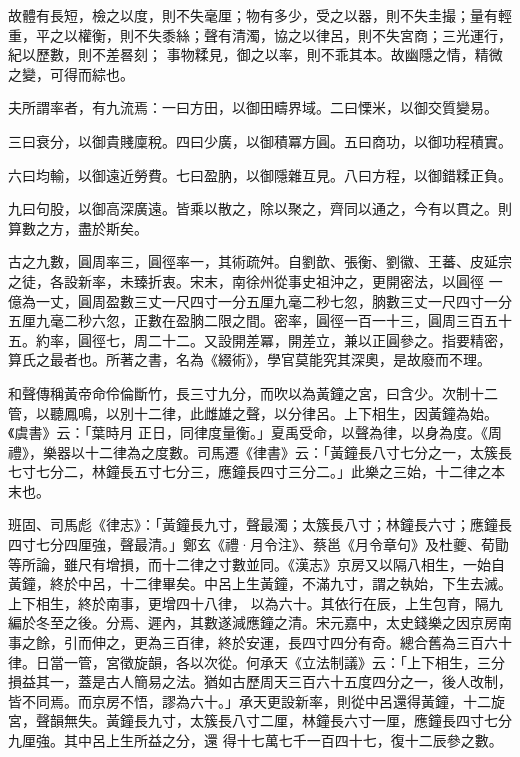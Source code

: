 \begin{pinyinscope}
 故體有長短，檢之以度，則不失毫厘；物有多少，受之以器，則不失圭撮；量有輕重，平之以權衡，則不失黍絲；聲有清濁，協之以律呂，則不失宮商；三光運行，紀以歷數，則不差晷刻；
 事物糅見，御之以率，則不乖其本。故幽隱之情，精微之變，可得而綜也。



 夫所謂率者，有九流焉：一曰方田，以御田疇界域。二曰慄米，以御交質變易。



 三曰衰分，以御貴賤廩稅。四曰少廣，以御積冪方圓。五曰商功，以御功程積實。



 六曰均輸，以御遠近勞費。七曰盈肭，以御隱雜互見。八曰方程，以御錯糅正負。



 九曰句股，以御高深廣遠。皆乘以散之，除以聚之，齊同以通之，今有以貫之。則算數之方，盡於斯矣。



 古之九數，圓周率三，圓徑率一，其術疏舛。自劉歆、張衡、劉徽、王蕃、皮延宗之徒，各設新率，未臻折衷。宋末，南徐州從事史祖沖之，更開密法，以圓徑
 一億為一丈，圓周盈數三丈一尺四寸一分五厘九毫二秒七忽，朒數三丈一尺四寸一分五厘九毫二秒六忽，正數在盈朒二限之間。密率，圓徑一百一十三，圓周三百五十五。約率，圓徑七，周二十二。又設開差冪，開差立，兼以正圓參之。指要精密，算氏之最者也。所著之書，名為《綴術》，學官莫能究其深奧，是故廢而不理。



 和聲傳稱黃帝命伶倫斷竹，長三寸九分，而吹以為黃鐘之宮，曰含少。次制十二管，以聽鳳鳴，以別十二律，此雌雄之聲，以分律呂。上下相生，因黃鐘為始。《虞書》云：「葉時月
 正日，同律度量衡。」夏禹受命，以聲為律，以身為度。《周禮》，樂器以十二律為之度數。司馬遷《律書》云：「黃鐘長八寸七分之一，太簇長七寸七分二，林鐘長五寸七分三，應鐘長四寸三分二。」此樂之三始，十二律之本末也。



 班固、司馬彪《律志》：「黃鐘長九寸，聲最濁；太簇長八寸；林鐘長六寸；應鐘長四寸七分四厘強，聲最清。」鄭玄《禮·月令注》、蔡邕《月令章句》及杜夔、荀勖等所論，雖尺有增損，而十二律之寸數並同。《漢志》京房又以隔八相生，一始自黃鐘，終於中呂，十二律畢矣。中呂上生黃鐘，不滿九寸，謂之執始，下生去滅。上下相生，終於南事，更增四十八律，
 以為六十。其依行在辰，上生包育，隔九編於冬至之後。分焉、遲內，其數遂減應鐘之清。宋元嘉中，太史錢樂之因京房南事之餘，引而伸之，更為三百律，終於安運，長四寸四分有奇。總合舊為三百六十律。日當一管，宮徵旋韻，各以次從。何承天《立法制議》云：「上下相生，三分損益其一，蓋是古人簡易之法。猶如古歷周天三百六十五度四分之一，後人改制，皆不同焉。而京房不悟，謬為六十。」承天更設新率，則從中呂還得黃鐘，十二旋宮，聲韻無失。黃鐘長九寸，太簇長八寸二厘，林鐘長六寸一厘，應鐘長四寸七分九厘強。其中呂上生所益之分，還
 得十七萬七千一百四十七，復十二辰參之數。




\end{pinyinscope}
